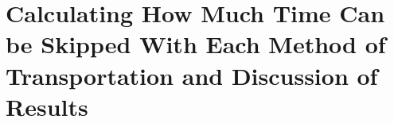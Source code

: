 \chapter{Calculating How Much Time Can be Skipped With Each Method of Transportation and Discussion of Results}
	
	
	
	
	
